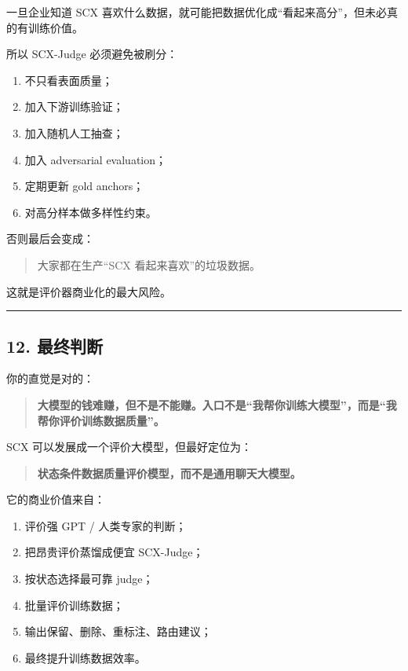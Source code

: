 \documentclass[
  12pt,
]{ctexart}
\providecommand{\tightlist}{%
  \setlength{\itemsep}{0pt}\setlength{\parskip}{0pt}}
\begin{document}
一旦企业知道 SCX
喜欢什么数据，就可能把数据优化成``看起来高分''，但未必真的有训练价值。

所以 SCX-Judge 必须避免被刷分：

\begin{enumerate}
\def\labelenumi{\arabic{enumi}.}
\tightlist
\item
  不只看表面质量；
\item
  加入下游训练验证；
\item
  加入随机人工抽查；
\item
  加入 adversarial evaluation；
\item
  定期更新 gold anchors；
\item
  对高分样本做多样性约束。
\end{enumerate}

否则最后会变成：

\begin{quote}
大家都在生产``SCX 看起来喜欢''的垃圾数据。
\end{quote}

这就是评价器商业化的最大风险。

\begin{center}\rule{0.5\linewidth}{0.5pt}\end{center}

\subsection{12. 最终判断}\label{ux6700ux7ec8ux5224ux65ad-5}

你的直觉是对的：

\begin{quote}
\textbf{大模型的钱难赚，但不是不能赚。入口不是``我帮你训练大模型''，而是``我帮你评价训练数据质量''。}
\end{quote}

SCX 可以发展成一个评价大模型，但最好定位为：

\begin{quote}
\textbf{状态条件数据质量评价模型，而不是通用聊天大模型。}
\end{quote}

它的商业价值来自：

\begin{enumerate}
\def\labelenumi{\arabic{enumi}.}
\tightlist
\item
  评价强 GPT / 人类专家的判断；
\item
  把昂贵评价蒸馏成便宜 SCX-Judge；
\item
  按状态选择最可靠 judge；
\item
  批量评价训练数据；
\item
  输出保留、删除、重标注、路由建议；
\item
  最终提升训练数据效率。
\end{enumerate}
\end{document}
